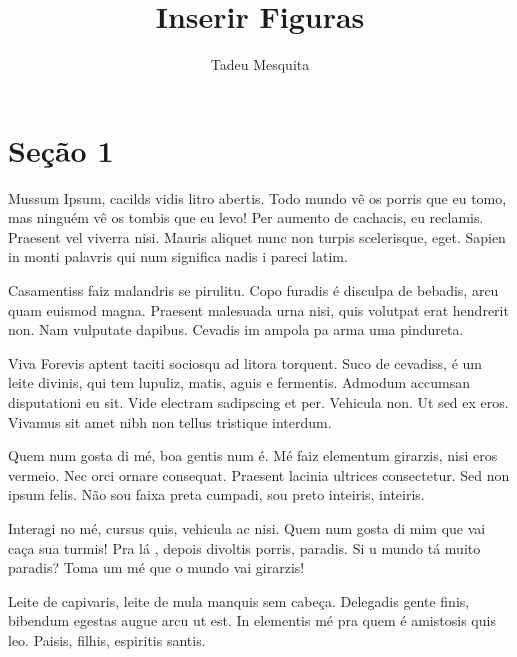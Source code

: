 \documentclass{article}
\begin{document}
	
	\title{\textbf{{\Huge Inserir Figuras}}} %
	\author{Tadeu Mesquita} %
	\date{} %
	\maketitle %
	\thispagestyle{empty} %
	\newpage
	
	\setcounter{page}{1} %
	\tableofcontents %
	\newpage
	
	\listoffigures
	\newpage
	
	\setcounter{page}{1} %
	\section{Seção 1}
	
	Mussum Ipsum, cacilds vidis litro abertis. Todo mundo vê os porris que eu tomo, mas ninguém vê os tombis que eu levo! Per aumento de cachacis, eu reclamis. Praesent vel viverra nisi. Mauris aliquet nunc non turpis scelerisque, eget. Sapien in monti palavris qui num significa nadis i pareci latim.
	
	Casamentiss faiz malandris se pirulitu. Copo furadis é disculpa de bebadis, arcu quam euismod magna. Praesent malesuada urna nisi, quis volutpat erat hendrerit non. Nam vulputate dapibus. Cevadis im ampola pa arma uma pindureta.
	
	Viva Forevis aptent taciti sociosqu ad litora torquent. Suco de cevadiss, é um leite divinis, qui tem lupuliz, matis, aguis e fermentis. Admodum accumsan disputationi eu sit. Vide electram sadipscing et per. Vehicula non. Ut sed ex eros. Vivamus sit amet nibh non tellus tristique interdum.
	
	Quem num gosta di mé, boa gentis num é. Mé faiz elementum girarzis, nisi eros vermeio. Nec orci ornare consequat. Praesent lacinia ultrices consectetur. Sed non ipsum felis. Não sou faixa preta cumpadi, sou preto inteiris, inteiris.
	
	Interagi no mé, cursus quis, vehicula ac nisi. Quem num gosta di mim que vai caça sua turmis! Pra lá , depois divoltis porris, paradis. Si u mundo tá muito paradis? Toma um mé que o mundo vai girarzis!
	
	Leite de capivaris, leite de mula manquis sem cabeça. Delegadis gente finis, bibendum egestas augue arcu ut est. In elementis mé pra quem é amistosis quis leo. Paisis, filhis, espiritis santis.
	
\end{document}
